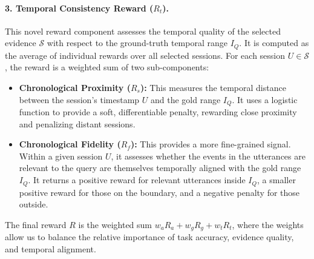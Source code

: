 \documentclass{article} %
\begin{document}
\paragraph{3. Temporal Consistency Reward ($R_t$).}
This novel reward component assesses the temporal quality of the selected evidence $\mathcal{S}$ with respect to the ground-truth temporal range $I_Q$. It is computed as the average of individual rewards over all selected sessions. For each session $U \in \mathcal{S}$, the reward is a weighted sum of two sub-components:
\begin{itemize}
    \item \textbf{Chronological Proximity  ($R_s$):} This measures the temporal distance between the session's timestamp $U$ and the gold range $I_Q$. It uses a logistic function to provide a soft, differentiable penalty, rewarding close proximity and penalizing distant sessions.
    \item \textbf{Chronological Fidelity ($R_f$):} This provides a more fine-grained signal. Within a given session $U$, it assesses whether the events in the utterances are relevant to the query are themselves temporally aligned with the gold range $I_Q$. It returns a positive reward for relevant utterances inside $I_Q$, a smaller positive reward for those on the boundary, and a negative penalty for those outside.
\end{itemize}
The final reward $R$ is the weighted sum $w_a R_a + w_g R_g + w_t R_t$, where the weights allow us to balance the relative importance of task accuracy, evidence quality, and temporal alignment.
\end{document}
